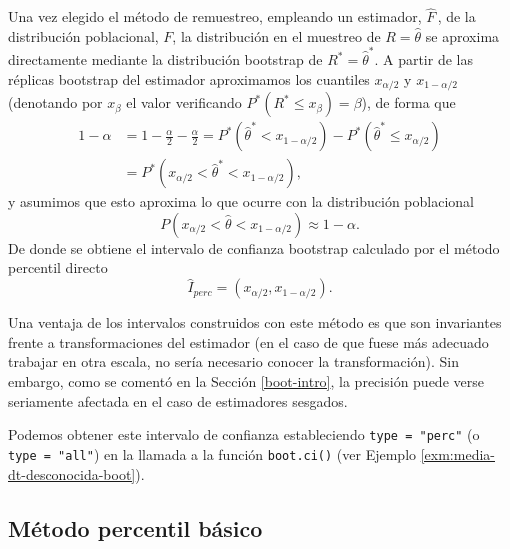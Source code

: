 \documentclass[
  10pt,
]{book}
\theoremstyle{break}
\theoremstyle{nonumberplain}
\begin{document}
Una vez elegido el método de remuestreo, empleando un estimador, \(\hat{F}\,\), de la
distribución poblacional, \(F\), la distribución en el muestreo de \(R = \hat{\theta}\) se aproxima directamente mediante la distribución bootstrap de \(R^{\ast}= \hat{\theta}^{\ast}\).
A partir de las réplicas bootstrap del estimador aproximamos los cuantiles \(x_{\alpha /2}\) y \(x_{1-\alpha /2}\) (denotando por \(x_{\beta }\) el valor verificando \(P^{\ast}\left( R^{\ast }\leq x_{\beta } \right) =\beta\)), de forma que
\[\begin{aligned}
1-\alpha &= 1-\frac{\alpha }{2}-\frac{\alpha }{2}
= P^{\ast}\left( \hat{\theta}^{\ast}<x_{1-\alpha /2} \right) - P^{\ast}\left( \hat{\theta}^{\ast}\leq x_{\alpha /2} \right) \\
&= P^{\ast}\left( x_{\alpha /2}<\hat{\theta}^{\ast}<x_{1-\alpha /2} \right),
\end{aligned}\]
y asumimos que esto aproxima lo que ocurre con la distribución poblacional
\[P\left( x_{\alpha /2} < \hat{\theta} < x_{1-\alpha /2} \right) \approx 1-\alpha.\]
De donde se obtiene el intervalo de confianza bootstrap calculado
por el método percentil directo
\[\hat{I}_{perc}=\left( x_{\alpha /2}, x_{1-\alpha /2}  \right).\]

Una ventaja de los intervalos construidos con este método es que son invariantes frente a transformaciones del estimador (en el caso de que fuese más adecuado trabajar en otra escala, no sería necesario conocer la transformación).
Sin embargo, como se comentó en la Sección \ref{boot-intro}, la precisión puede verse seriamente afectada en el caso de estimadores sesgados.

Podemos obtener este intervalo de confianza estableciendo \texttt{type\ =\ "perc"} (o \texttt{type\ =\ "all"}) en la llamada a la función \texttt{boot.ci()} (ver Ejemplo \ref{exm:media-dt-desconocida-boot}).

\hypertarget{boot-ic-basic}{%
\subsection{Método percentil básico}\label{boot-ic-basic}}
\end{document}
